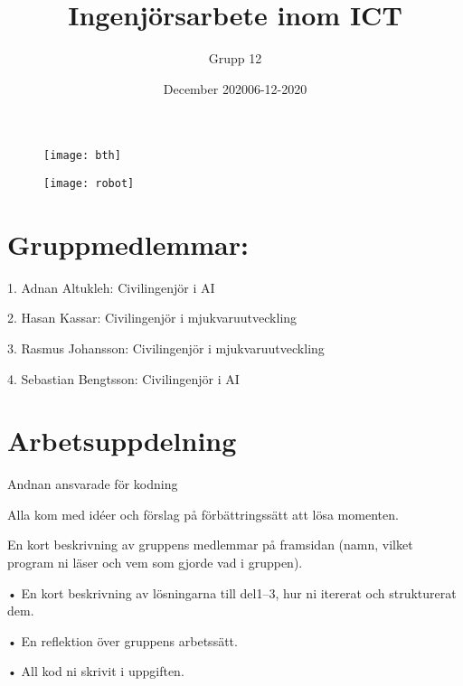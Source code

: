 \documentclass{article}
\title{Ingenjörsarbete inom ICT}
\author{Grupp 12}
\date{December 2020}
\date{06-12-2020}
\begin{document}
\maketitle

\begin{figure}[h!]
    \centering
    \texttt{[image: bth]}

    \texttt{[image: robot]}
\end{figure}

\newpage

\section{Gruppmedlemmar:}
{\setlength{\parindent}{0cm}

1. Adnan Altukleh: Civilingenjör i AI
     
2. Hasan Kassar: Civilingenjör i mjukvaruutveckling
    
3. Rasmus Johansson: Civilingenjör i mjukvaruutveckling
    
4. Sebastian Bengtsson: Civilingenjör i AI
}

\section{Arbetsuppdelning}
{\setlength{\parindent}{0cm}

Andnan ansvarade för kodning

Alla kom med idéer och förslag på förbättringssätt att lösa momenten.

En kort beskrivning av gruppens medlemmar på framsidan (namn, vilket
program ni läser och vem som gjorde vad i gruppen).

• En kort beskrivning av lösningarna till del1--3, hur ni itererat och
strukturerat dem.

• En reflektion över gruppens arbetssätt.

• All kod ni skrivit i uppgiften.
}
\end{document}
